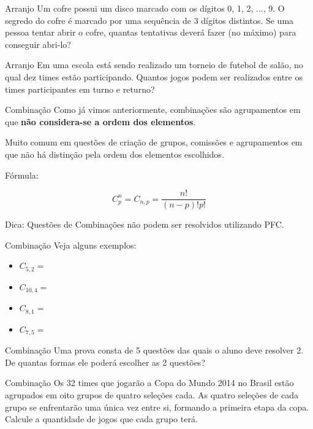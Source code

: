 \documentclass[aspectratio=169,xcolor=dvipsnames]{beamer}
\begin{document}
\begin{frame}[t]{Arranjo}
    Um cofre possui um disco marcado com os dígitos 0, 1, 2, ..., 9. O segredo do cofre é marcado
por uma sequência de 3 dígitos distintos. Se uma pessoa tentar abrir o cofre, quantas tentativas
deverá fazer (no máximo) para conseguir abri-lo?
\end{frame}

\begin{frame}[t]{Arranjo}
    Em uma escola está sendo realizado um torneio de futebol de salão, no qual dez times estão
participando. Quantos jogos podem ser realizados entre os times participantes em turno e
returno?
\end{frame}

\begin{frame}{Combinação}
    Como já vimos anteriormente, combinações são agrupamentos em que \textbf{não considera-se a ordem dos elementos}.

    \vspace{.5cm}

    Muito comum em questões de criação de grupos, comissões e agrupamentos em que não há distinção pela ordem dos elementos escolhidos.

    \vspace{.5cm}

    Fórmula:

    \begin{equation*}
        C_p^n = C_{n,p} = \dfrac{n!}{(n-p)!p!}
    \end{equation*}

    \vspace{.5cm}

    Dica: Questões de Combinações não podem ser resolvidos utilizando PFC.
\end{frame}

\begin{frame}[t]{Combinação}
    Veja alguns exemplos:

    \vspace{.5cm}

    \begin{itemize}
        \setlength\itemsep{1em}
        \item $C_{5,2} = $
        \item $C_{10,4} = $
        \item $C_{8,1} = $
        \item $C_{7,5} = $
    \end{itemize}

\end{frame}

\begin{frame}[t]{Combinação}
    Uma prova consta de 5 questões das quais o aluno deve resolver 2. De quantas formas
    ele poderá escolher as 2 questões?
\end{frame}

\begin{frame}[t]{Combinação}
    Os 32 times que jogarão a Copa do Mundo 2014 no Brasil estão agrupados em oito grupos de
quatro seleções cada. As quatro seleções de cada grupo se enfrentarão uma única vez entre si,
formando a primeira etapa da copa. Calcule a quantidade de jogos que cada grupo terá.
\end{frame}
\end{document}
